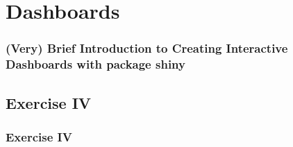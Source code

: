 \section{Dashboards}

\begin{frame}[fragile]
	\frametitle{(Very) Brief Introduction to Creating Interactive Dashboards with package \ttfamily shiny \normalfont}
\end{frame}

\subsection{Exercise IV}
\begin{frame}
	\frametitle{Exercise IV}
	
\end{frame}